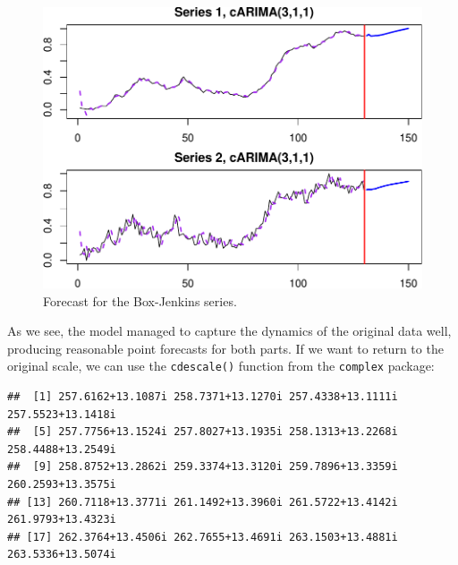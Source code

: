 \documentclass[
]{book}
\newenvironment{Shaded}{\begin{snugshade}}{\end{snugshade}}
\newcommand{\AttributeTok}[1]{\textcolor[rgb]{0.77,0.63,0.00}{#1}}
\newcommand{\ConstantTok}[1]{\textcolor[rgb]{0.00,0.00,0.00}{#1}}
\newcommand{\DecValTok}[1]{\textcolor[rgb]{0.00,0.00,0.81}{#1}}
\newcommand{\FunctionTok}[1]{\textcolor[rgb]{0.00,0.00,0.00}{#1}}
\newcommand{\NormalTok}[1]{#1}
\newcommand{\OtherTok}[1]{\textcolor[rgb]{0.56,0.35,0.01}{#1}}
\newcommand{\SpecialCharTok}[1]{\textcolor[rgb]{0.00,0.00,0.00}{#1}}
\newcommand{\StringTok}[1]{\textcolor[rgb]{0.31,0.60,0.02}{#1}}
\begin{document}
\begin{figure}
\centering
\includegraphics{Svetunkov---Svetunkov---Complex-Valued-Econometrics_files/figure-latex/BJSalesComplexForecast-1.pdf}
\caption{\label{fig:BJSalesComplexForecast}Forecast for the Box-Jenkins series.}
\end{figure}

As we see, the model managed to capture the dynamics of the original data well, producing reasonable point forecasts for both parts. If we want to return to the original scale, we can use the \texttt{cdescale()} function from the \texttt{complex} package:

\begin{Shaded}
\end{Shaded}

\begin{verbatim}
##  [1] 257.6162+13.1087i 258.7371+13.1270i 257.4338+13.1111i 257.5523+13.1418i
##  [5] 257.7756+13.1524i 257.8027+13.1935i 258.1313+13.2268i 258.4488+13.2549i
##  [9] 258.8752+13.2862i 259.3374+13.3120i 259.7896+13.3359i 260.2593+13.3575i
## [13] 260.7118+13.3771i 261.1492+13.3960i 261.5722+13.4142i 261.9793+13.4323i
## [17] 262.3764+13.4506i 262.7655+13.4691i 263.1503+13.4881i 263.5336+13.5074i
\end{verbatim}
\end{document}
